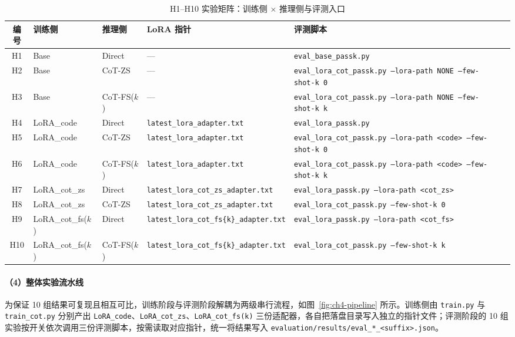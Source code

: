\begin{table}[!htb]
  \centering
  \caption{H1--H10 实验矩阵：训练侧 $\times$ 推理侧与评测入口}
  \label{tab:ch4-matrix}
  \footnotesize
  \setlength{\tabcolsep}{3pt}
  \begin{tabular}{clllll}
    \toprule
    编号 & 训练侧 & 推理侧 & LoRA 指针 & 评测脚本 \\
    \midrule
    H1  & Base            & Direct      & ---                                    & \texttt{eval\_base\_passk.py} \\
    H2  & Base            & CoT-ZS      & ---                                    & \texttt{eval\_lora\_cot\_passk.py --lora-path NONE --few-shot-k 0} \\
    H3  & Base            & CoT-FS($k$) & ---                                    & \texttt{eval\_lora\_cot\_passk.py --lora-path NONE --few-shot-k k} \\
    H4  & LoRA\_code      & Direct      & \texttt{latest\_lora\_adapter.txt}       & \texttt{eval\_lora\_passk.py} \\
    H5  & LoRA\_code      & CoT-ZS      & \texttt{latest\_lora\_adapter.txt}       & \texttt{eval\_lora\_cot\_passk.py --lora-path <code> --few-shot-k 0} \\
    H6  & LoRA\_code      & CoT-FS($k$) & \texttt{latest\_lora\_adapter.txt}       & \texttt{eval\_lora\_cot\_passk.py --lora-path <code> --few-shot-k k} \\
    H7  & LoRA\_cot\_zs   & Direct      & \texttt{latest\_lora\_cot\_zs\_adapter.txt} & \texttt{eval\_lora\_passk.py --lora-path <cot\_zs>} \\
    H8  & LoRA\_cot\_zs   & CoT-ZS      & \texttt{latest\_lora\_cot\_zs\_adapter.txt} & \texttt{eval\_lora\_cot\_passk.py --few-shot-k 0} \\
    H9  & LoRA\_cot\_fs($k$) & Direct   & \texttt{latest\_lora\_cot\_fs\{k\}\_adapter.txt} & \texttt{eval\_lora\_passk.py --lora-path <cot\_fs>} \\
    H10 & LoRA\_cot\_fs($k$) & CoT-FS($k$) & \texttt{latest\_lora\_cot\_fs\{k\}\_adapter.txt} & \texttt{eval\_lora\_cot\_passk.py --few-shot-k k} \\
    \bottomrule
  \end{tabular}
\end{table}

\paragraph{（4）整体实验流水线}
为保证 10 组结果可复现且相互可比，训练阶段与评测阶段解耦为两级串行流程，如图~\ref{fig:ch4-pipeline} 所示。训练侧由 \texttt{train.py} 与 \texttt{train\_cot.py} 分别产出 \texttt{LoRA\_code}、\texttt{LoRA\_cot\_zs}、\texttt{LoRA\_cot\_fs(k)} 三份适配器，各自把落盘目录写入独立的指针文件；评测阶段的 10 组实验按开关依次调用三份评测脚本，按需读取对应指针，统一将结果写入 \texttt{evaluation/results/eval\_*\_<suffix>.json}。

